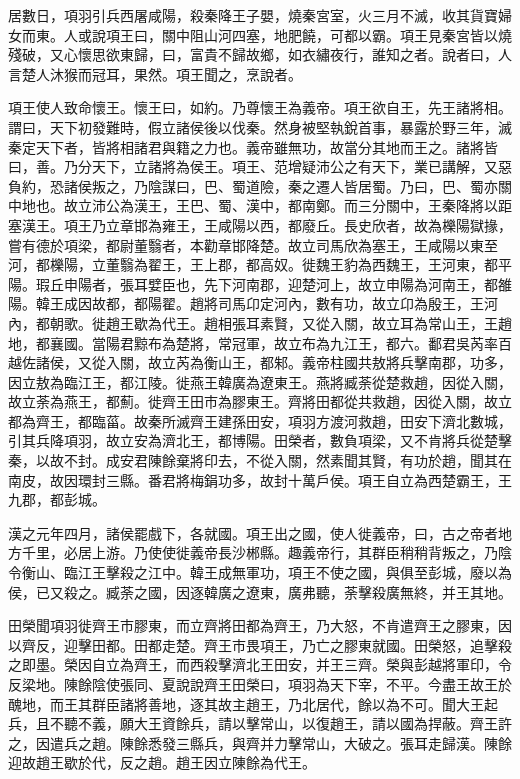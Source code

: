 居數日，項羽引兵西屠咸陽，殺秦降王子嬰，燒秦宮室，火三月不滅，收其貨寶婦女而東。人或說項王曰，關中阻山河四塞，地肥饒，可都以霸。項王見秦宮皆以燒殘破，又心懷思欲東歸，曰，富貴不歸故鄉，如衣繡夜行，誰知之者。說者曰，人言楚人沐猴而冠耳，果然。項王聞之，烹說者。

項王使人致命懷王。懷王曰，如約。乃尊懷王為義帝。項王欲自王，先王諸將相。謂曰，天下初發難時，假立諸侯後以伐秦。然身被堅執銳首事，暴露於野三年，滅秦定天下者，皆將相諸君與籍之力也。義帝雖無功，故當分其地而王之。諸將皆曰，善。乃分天下，立諸將為侯王。項王、范增疑沛公之有天下，業已講解，又惡負約，恐諸侯叛之，乃陰謀曰，巴、蜀道險，秦之遷人皆居蜀。乃曰，巴、蜀亦關中地也。故立沛公為漢王，王巴、蜀、漢中，都南鄭。而三分關中，王秦降將以距塞漢王。項王乃立章邯為雍王，王咸陽以西，都廢丘。長史欣者，故為櫟陽獄掾，嘗有德於項梁，都尉董翳者，本勸章邯降楚。故立司馬欣為塞王，王咸陽以東至河，都櫟陽，立董翳為翟王，王上郡，都高奴。徙魏王豹為西魏王，王河東，都平陽。瑕丘申陽者，張耳嬖臣也，先下河南郡，迎楚河上，故立申陽為河南王，都雒陽。韓王成因故都，都陽翟。趙將司馬卬定河內，數有功，故立卬為殷王，王河內，都朝歌。徙趙王歇為代王。趙相張耳素賢，又從入關，故立耳為常山王，王趙地，都襄國。當陽君黥布為楚將，常冠軍，故立布為九江王，都六。鄱君吳芮率百越佐諸侯，又從入關，故立芮為衡山王，都邾。義帝柱國共敖將兵擊南郡，功多，因立敖為臨江王，都江陵。徙燕王韓廣為遼東王。燕將臧荼從楚救趙，因從入關，故立荼為燕王，都薊。徙齊王田市為膠東王。齊將田都從共救趙，因從入關，故立都為齊王，都臨菑。故秦所滅齊王建孫田安，項羽方渡河救趙，田安下濟北數城，引其兵降項羽，故立安為濟北王，都博陽。田榮者，數負項梁，又不肯將兵從楚擊秦，以故不封。成安君陳餘棄將印去，不從入關，然素聞其賢，有功於趙，聞其在南皮，故因環封三縣。番君將梅鋗功多，故封十萬戶侯。項王自立為西楚霸王，王九郡，都彭城。

漢之元年四月，諸侯罷戲下，各就國。項王出之國，使人徙義帝，曰，古之帝者地方千里，必居上游。乃使使徙義帝長沙郴縣。趣義帝行，其群臣稍稍背叛之，乃陰令衡山、臨江王擊殺之江中。韓王成無軍功，項王不使之國，與俱至彭城，廢以為侯，已又殺之。臧荼之國，因逐韓廣之遼東，廣弗聽，荼擊殺廣無終，并王其地。

田榮聞項羽徙齊王市膠東，而立齊將田都為齊王，乃大怒，不肯遣齊王之膠東，因以齊反，迎擊田都。田都走楚。齊王市畏項王，乃亡之膠東就國。田榮怒，追擊殺之即墨。榮因自立為齊王，而西殺擊濟北王田安，并王三齊。榮與彭越將軍印，令反梁地。陳餘陰使張同、夏說說齊王田榮曰，項羽為天下宰，不平。今盡王故王於醜地，而王其群臣諸將善地，逐其故主趙王，乃北居代，餘以為不可。聞大王起兵，且不聽不義，願大王資餘兵，請以擊常山，以復趙王，請以國為捍蔽。齊王許之，因遣兵之趙。陳餘悉發三縣兵，與齊并力擊常山，大破之。張耳走歸漢。陳餘迎故趙王歇於代，反之趙。趙王因立陳餘為代王。

